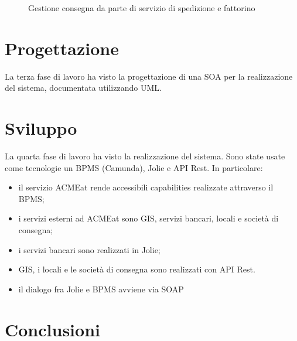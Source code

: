 \documentclass[11pt]{article} %
\begin{document}
\begin{figure}[!ht]
\begin{center}
\caption{Gestione consegna da parte di servizio di spedizione e fattorino}
\end{center}
\end{figure}

\clearpage

\section{Progettazione}

La terza fase di lavoro ha visto la progettazione di una SOA per la realizzazione del sistema, documentata utilizzando UML.

\clearpage

\section{Sviluppo}

La quarta fase di lavoro ha visto la realizzazione del sistema. Sono state usate come tecnologie un BPMS (Camunda), Jolie e API Rest. In particolare:
\begin{itemize}
\item il servizio ACMEat rende accessibili capabilities realizzate attraverso il BPMS;
\item i servizi esterni ad ACMEat sono GIS, servizi bancari, locali e società di consegna;
\item i servizi bancari sono realizzati in Jolie;
\item GIS, i locali e le società di consegna sono realizzati con API Rest.
\item il dialogo fra Jolie e BPMS avviene via SOAP
\end{itemize}

\clearpage

\section{Conclusioni}
\end{document}
